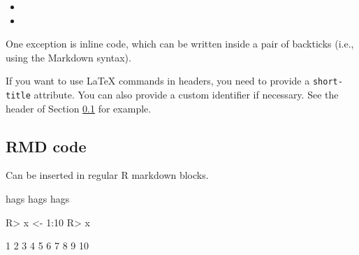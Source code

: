 \documentclass[
  shortnames]{jss}
\begin{document}
\begin{itemize}
\item
\item
\end{itemize}

One exception is inline code, which can be written inside a pair of
backticks (i.e., using the Markdown syntax).

If you want to use LaTeX commands in headers, you need to provide a
\texttt{short-title} attribute. You can also provide a custom identifier
if necessary. See the header of Section \ref{r-code} for example.

\subsection[R code]{RMD  code}\label{r-code}

Can be inserted in regular R markdown blocks.

hags hags hags \cite{Neal2004}

\begin{CodeChunk}
\begin{CodeInput}
R> x <- 1:10
R> x
\end{CodeInput}
\begin{CodeOutput}
 [1]  1  2  3  4  5  6  7  8  9 10
\end{CodeOutput}
\end{CodeChunk}


\end{document}
